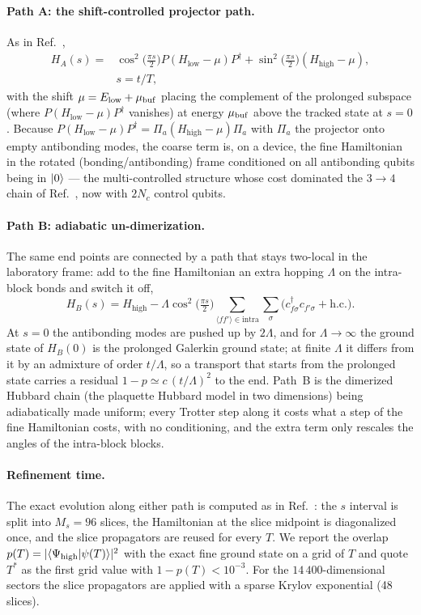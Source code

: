 \documentclass[
  aps,
  prc,
  reprint,
  superscriptaddress,
  floatfix,
  nofootinbib
]{revtex4-2}
\newcommand{\Hlow}{H_{\mathrm{low}}}
\newcommand{\Hhigh}{H_{\mathrm{high}}}
\begin{document}
\paragraph{Path A: the shift-controlled projector path.}
As in Ref.~\cite{EigenQPairing2026},
\begin{align}
  H_A(s)={}&\cos^2\!\big(\tfrac{\pi s}{2}\big)P(\Hlow-\mu)P^\dagger
        +\sin^2\!\big(\tfrac{\pi s}{2}\big)(\Hhigh-\mu),\nonumber\\
        &s=t/T,
  \label{eq:pathA}
\end{align}
with the shift $\mu=E_{\rm low}+\mu_{\rm buf}$ placing the complement of the
prolonged subspace (where $P(\Hlow-\mu)P^\dagger$ vanishes) at energy
$\mu_{\rm buf}$ above the tracked state at $s=0$.  Because
$P(\Hlow-\mu)P^\dagger=\Pi_a(\Hhigh-\mu)\Pi_a$ with $\Pi_a$ the projector onto
empty antibonding modes, the coarse term is, on a device, the fine
Hamiltonian in the rotated (bonding/antibonding) frame conditioned on all
antibonding qubits being in $\ket{0}$ --- the multi-controlled structure whose
cost dominated the $3\to4$ chain of Ref.~\cite{EigenQPairing2026}, now with
$2N_c$ control qubits.

\paragraph{Path B: adiabatic un-dimerization.}
The same end points are connected by a path that stays two-local in the
laboratory frame: add to the fine Hamiltonian an extra hopping $\Lambda$ on
the intra-block bonds and switch it off,
\begin{equation}
  H_B(s)=\Hhigh-\Lambda\cos^2\!\big(\tfrac{\pi s}{2}\big)
  \sum_{\langle ff'\rangle\in\mathrm{intra}}\sum_\sigma
  \big(c^\dagger_{f\sigma}c_{f'\sigma}+\mathrm{h.c.}\big).
  \label{eq:pathB}
\end{equation}
At $s=0$ the antibonding modes are pushed up by $2\Lambda$, and for
$\Lambda\to\infty$ the ground state of $H_B(0)$ is the prolonged Galerkin
ground state; at finite $\Lambda$ it differs from it by an admixture of
order $t/\Lambda$, so a transport that starts from the prolonged state
carries a residual $1-p\simeq c\,(t/\Lambda)^2$ to the end.  Path~B is the
dimerized Hubbard chain (the plaquette Hubbard model in two dimensions)
being adiabatically made uniform; every Trotter step along it costs what a
step of the fine Hamiltonian costs, with no conditioning, and the extra term
only rescales the angles of the intra-block blocks.

\paragraph{Refinement time.}
The exact evolution along either path is computed as in
Ref.~\cite{EigenQPairing2026}: the $s$ interval is split into $M_s=96$
slices, the Hamiltonian at the slice midpoint is diagonalized once, and the
slice propagators are reused for every $T$.  We report the overlap
$p(T)=|\langle\Psi_{\rm high}|\psi(T)\rangle|^2$ with the exact fine ground
state on a grid of $T$ and quote $T^*$ as the first grid value with
$1-p(T)<10^{-3}$.  For the $14\,400$-dimensional sectors the slice
propagators are applied with a sparse Krylov exponential (48 slices).
\end{document}
